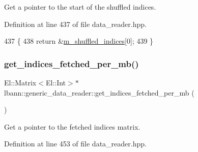 Get a pointer to the start of the shuffled indices. 



Definition at line 437 of file data\+\_\+reader.\+hpp.


\begin{DoxyCode}
437                      \{
438     \textcolor{keywordflow}{return} &\hyperlink{classlbann_1_1generic__data__reader_aaab6aeff67ffff1c689336851fec2c57}{m\_shuffled\_indices}[0];
439   \}
\end{DoxyCode}
\mbox{\label{classlbann_1_1generic__data__reader_a8d8b44ed55e2af49c70d29277ff57a91}} 
\subsubsection{\texorpdfstring{get\+\_\+indices\+\_\+fetched\+\_\+per\+\_\+mb()}{get\_indices\_fetched\_per\_mb()}}
{\footnotesize\ttfamily El\+::\+Matrix$<$El\+::\+Int$>$$\ast$ lbann\+::generic\+\_\+data\+\_\+reader\+::get\+\_\+indices\+\_\+fetched\+\_\+per\+\_\+mb (\begin{DoxyParamCaption}{ }\end{DoxyParamCaption})\hspace{0.3cm}{\ttfamily [inline]}}



Get a pointer to the fetched indices matrix. 



Definition at line 453 of file data\+\_\+reader.\+hpp.


